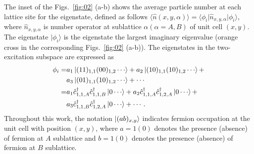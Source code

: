 \documentclass[longbibliography, aps, prx, amsmath, amssymb, amsfonts, twocolumn,superscriptaddress, footinbib]{revtex4-1}
\begin{document}
	The inset of the Figs.~\ref{fig:02} (a-b) shows the average particle number at each lattice site for the eigenstate, defined as follows $\langle \hat{n}(x,y,\alpha) \rangle = \langle \phi_i \vert \hat{n}_{x,y,\alpha} \vert \phi_i \rangle$,
	where 
	$\hat{n}_{x,y,\alpha}$ is number operator at sublattice $\alpha (\alpha=A,B)$ of unit cell $(x,y)$.
	The eigenstate $\vert \phi_i \rangle$ is the eigenstate the largest imaginary eigenvalue (orange cross in the corresponding Figs.~\ref{fig:02} (a-b)). The eigenstates in the two-excitation subspace are expressed as 
	\begin{equation}
		\begin{split}
			\phi_i =& a_1 \ket{(11)_{1,1}(00)_{1,2}\cdots} + a_2 \ket{(10)_{1,1}(10)_{1,2}\cdots} + \\
			&a_3 \ket{(01)_{1,1}(10)_{1,2}\cdots} + \cdots\\
			=& a_1 \hat{c}_{1,1,A}^{\dagger}\hat{c}_{1,1,B}^{\dagger} \ket{0\cdots} + a_2 \hat{c}_{1,1,A}^{\dagger}\hat{c}_{1,2,A}^{\dagger} \ket{0\cdots} + \\
			& a_3 \hat{c}_{1,1,B}^{\dagger}\hat{c}_{1,2,A}^{\dagger} \ket{0\cdots} + \cdots.
		\end{split}
	\end{equation}
	Throughout this work, the notation $\ket{(ab)_{x,y}}$ indicates fermion occupation at the unit cell with position $(x,y)$, where $a=1(0)$ denotes the presence (absence) of fermion at $A$ sublattice and $b=1(0)$ denotes the presence (absence) of fermion at $B$ sublattice.
\end{document}
